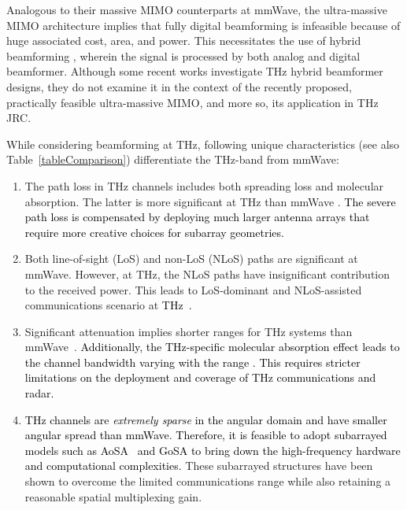 \documentclass[journal,10pt]{IEEEtran}
\begin{document}
	
	
	Analogous to their massive MIMO counterparts at mmWave, the ultra-massive MIMO architecture implies that fully digital beamforming is infeasible because of huge associated cost, area, and power. This necessitates the use of hybrid beamforming \cite{mimoHybridLeus1}, wherein the signal is  processed by both analog and digital beamformer. Although some recent works \cite{busari2019generalized,yuan2020hybrid,ning2021terahertz} investigate THz hybrid beamformer designs, they do not examine it in the context of the recently proposed, practically feasible ultra-massive MIMO, and more so, its application in THz JRC.
	
	{\color{black}While considering beamforming at THz, following unique characteristics (see also Table~\ref{tableComparison}) differentiate the THz-band from mmWave:
		\begin{enumerate}
			\item The path loss in THz channels includes both spreading loss and molecular absorption. The latter is more significant at THz than mmWave \cite{yuan2020hybrid}. \textcolor{black}{The severe path loss is compensated by deploying much larger antenna arrays that require more creative choices for subarray geometries.}
			\item Both line-of-sight (LoS) and non-LoS (NLoS) paths are significant at mmWave. However, at THz, the NLoS paths have insignificant contribution to the received power. This leads to LoS-dominant and NLoS-assisted communications scenario at \textcolor{black}{THz~\cite{faisal2020ultramassive,ummimoHBThzSVModel,Ning2021Jan,thz_beamSplit,trueTimeDelayBeamSquint}.}
			\item Significant attenuation implies shorter ranges for THz systems than mmWave~\cite{ummimoGrapheneArray}. \textcolor{black}{Additionally, the THz-specific molecular absorption effect leads to the channel bandwidth varying with the range \cite{hossain2019hierarchical}. This requires stricter limitations on the deployment and coverage of THz communications and radar.}
			\item \textcolor{black}{THz channels are \textit{extremely sparse} \cite{han2021hybrid} in the angular domain and have smaller angular spread than mmWave. Therefore, it is feasible to adopt subarrayed models such as AoSA~\cite{ummimoComMagYeLi} and GoSA to bring down the high-frequency hardware and computational complexities.} These subarrayed structures have been shown to overcome the limited communications range while also retaining a reasonable spatial multiplexing gain.

\end{enumerate}}
\end{document}
